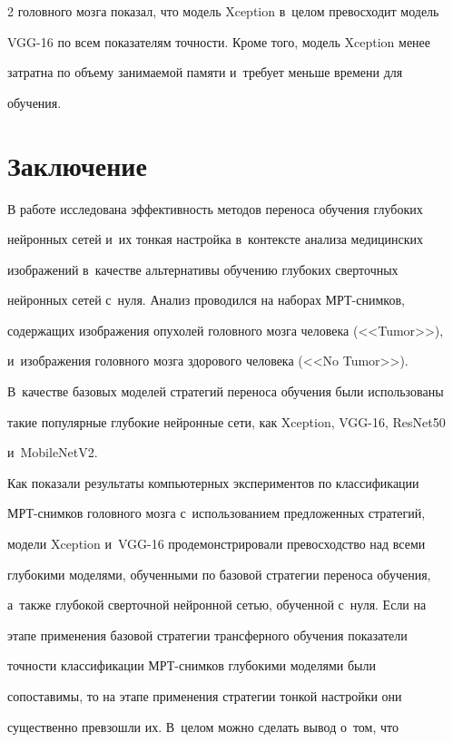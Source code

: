 \begin{multicols}{2}
головного мозга показал, что модель Xception в~целом превосходит модель 

VGG-16 по всем показателям точности. Кроме того, модель Xception менее 

затратна по объему занимаемой памяти и~требует меньше времени для 

обучения. 



\section{Заключение}



  В работе исследована эффективность методов переноса обучения глубоких 

нейронных сетей и~их тонкая настройка в~контексте анализа медицинских 

изображений в~качестве альтернативы обучению глубоких сверточных 

нейронных сетей с~нуля. Анализ проводился на наборах МРТ-сним\-ков, 

содержащих изображения опухолей головного мозга человека (<<Tumor>>), 

и~изображения головного мозга здорового человека (<<No Tumor>>). 

В~качестве базовых моделей стратегий переноса обучения были использованы 

такие популярные глубокие нейронные сети, как Xception, VGG-16, ResNet50 

и~\mbox{MobileNetV2}. 

  

  Как показали результаты компьютерных экспериментов по классификации 

МРТ-сним\-ков головного мозга с~использованием предложенных стратегий, 

модели Xception и~VGG-16 продемонстрировали превосходство над всеми 

глубокими моделями, обучен\-ны\-ми по базовой стратегии переноса обуче\-ния, 

а~так\-же глубокой сверточной нейронной \mbox{сетью}, обучен\-ной с~нуля. Если на 

этапе применения базовой стратегии трансферного обуче\-ния показатели 

точности классификации МРТ-сним\-ков глубокими моделями были 

сопоставимы, то на этапе применения стратегии тонкой настройки они 

существенно превзошли их. В~\mbox{целом} можно сделать вывод о~том, что 


\end{multicols}
